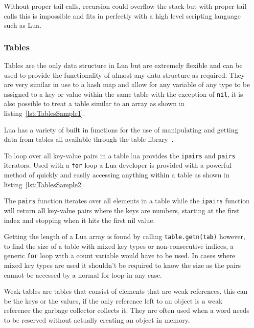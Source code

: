 \documentclass[11pt,a4paper,titlepage]{article}
\begin{document}
			Without proper tail calls, recursion could overflow the stack but with proper tail calls this is impossible and fits in perfectly with a high level scripting language such as Lua.

		\subsubsection{Tables}
			Tables are the only data structure in Lua but are extremely flexible and can be used to provide the functionality of almost any data structure as required. They are very similar in use to a hash map and allow for any variable of any type to be assigned to a key or value within the same table with the exception of \texttt{nil}, it is also possible to treat a table similar to an array as shown in listing~\ref{lst:TablesSample1}.
			

			Lua has a variety of built in functions for the use of manipulating and getting data from tables all available through the table library~\cite{LuaMan}.

			To loop over all key-value pairs in a table lua provides the \texttt{ipairs} and \texttt{pairs} iterators. Used with a \texttt{for} loop a Lua developer is provided with a powerful method of quickly and easily accessing anything within a table as shown in listing~\ref{lst:TablesSample2}.
			

			The \texttt{pairs} function iterates over all elements in a table while the \texttt{ipairs} function will return all key-value pairs where the keys are numbers, starting at the first index and stopping when it hits the first nil value.~\cite{Ierusalimschy:2013:PLT:2502646} 
			
			Getting the length of a Lua array is found by calling \texttt{table.getn(tab)} however, to find the size of a table with mixed key types or non-consecutive indices, a generic \texttt{for} loop with a count variable would have to be used. In cases where mixed key types are used it shouldn't be required to know the size as the pairs cannot be accessed by a normal for loop in any case.

			Weak tables are tables that consist of elements that are weak references, this can be the keys or the values, if the only reference left to an object is a weak reference the garbage collector collects it. They are often used when a word needs to be reserved without actually creating an object in memory.
			
\end{document}
